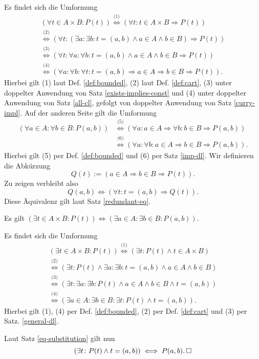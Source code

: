 \begin{Beweis}
Es findet sich die Umformung
\begin{gather*}
(\forall t \in A{\times}B\colon P(t))
\stackrel{\text{(1)}}{\iff} (\forall t\colon t\in A\times B\Rightarrow P(t))\\
\stackrel{\text{(2)}}{\iff}
(\forall t\colon (\exists a\colon\exists b\colon t=(a,b)\land a\in A\land b\in B)\Rightarrow P(t))\\
\stackrel{\text{(3)}}{\iff}
(\forall t\colon\forall a\colon\forall b\colon t=(a,b)\land a\in A\land b\in B\Rightarrow P(t))\\
\stackrel{\text{(4)}}{\iff}
(\forall a\colon\forall b\colon\forall t\colon t=(a,b)\Rightarrow a\in A\Rightarrow b\in B\Rightarrow P(t)).
\end{gather*}
Hierbei gilt (1) laut Def. \ref{def:bounded}, (2) laut Def. \ref{def:cart},
(3) unter doppelter Anwendung von Satz \ref{exists-implies-const}
und (4) unter doppelter Anwendung von Satz \ref{all-cl}, gefolgt
von doppelter Anwendung von Satz \ref{curry-impl}.
Auf der anderen Seite gilt die Umformung
\begin{align*}
(\forall a{\in}A\colon\forall b{\in}B\colon P(a,b))
&\stackrel{\text{(5)}}{\iff}
(\forall a\colon a\in A\Rightarrow\forall b\colon b\in B\Rightarrow P(a,b))\\
&\stackrel{\text{(6)}}{\iff}
(\forall a\colon\forall b\colon a\in A\Rightarrow b\in B\Rightarrow P(a,b)).
\end{align*}
Hierbei gilt (5) per Def. \ref{def:bounded} und (6) per Satz \ref{imp-dl}.
Wir definieren die Abkürzung
\[Q(t) := (a\in A\Rightarrow b\in B\Rightarrow P(t)).\]
Zu zeigen verbleibt also
\[Q(a,b)\iff (\forall t\colon t=(a,b)\Rightarrow Q(t)).\]
Diese Äquivalenz gilt laut Satz \ref{redundant-eq}.\,\qedsymbol
\end{Beweis}

\begin{Satz}\label{exists-cart}
Es gilt $(\exists t\in A{\times}B\colon P(t))
\Leftrightarrow (\exists a{\in}A\colon \exists b{\in}B\colon P(a,b))$.
\end{Satz}

\begin{Beweis}
Es findet sich die Umformung
\begin{gather*}
(\exists t{\in}A{\times}B\colon P(t))
\stackrel{\text{(1)}}{\iff} (\exists t\colon P(t)\land t\in A\times B)\\
\stackrel{\text{(2)}}{\iff}
(\exists t\colon P(t)\land \exists a\colon\exists b\colon t=(a,b)\land a\in A\land b\in B)\\
\stackrel{\text{(3)}}{\iff}
(\exists t\colon \exists a\colon \exists b\colon P(t)\land a\in A\land b\in B\land t=(a,b))\\
\stackrel{\text{(4)}}{\iff}
(\exists a{\in}A\colon \exists b{\in}B\colon \exists t\colon P(t)\land t=(a,b)).
\end{gather*}
Hierbei gilt (1), (4) per Def. \ref{def:bounded}, (2) per Def. \ref{def:cart}
und (3) per Satz. \ref{general-dl}.

Laut Satz \ref{eq-substitution} gilt nun
\[(\exists t\colon P(t)\land t=(a,b))\iff P(a,b).\,\square\]
\end{Beweis}

